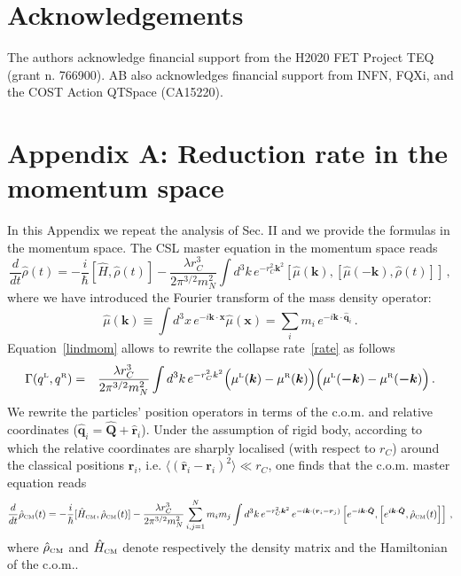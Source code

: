 \documentclass[11pt,onecolumn,amssymb,nofootinbib]{revtex4}
\newcommand\beq{\begin{equation}}
\newcommand\eeq{\end{equation}}
\newcommand\beqa{\begin{eqnarray}}
\newcommand\eeqa{\end{eqnarray}}
\newcommand\ro{\hat\rho}
\newcommand\Ho{\hat H}
\newcommand\bk{\boldsymbol{k}}
\newcommand\br{\boldsymbol{r}}
\newcommand\bqo{\hat{\boldsymbol{q}}}
\newcommand\bro{\hat{\boldsymbol{r}}}
\newcommand\bQo{\hat{\boldsymbol{Q}}}
\begin{document}
\section*{Acknowledgements}
The authors acknowledge financial support from the H2020 FET Project TEQ (grant n. 766900). AB also acknowledges financial support from INFN, FQXi, and the COST Action QTSpace (CA15220).

\section*{Appendix A: Reduction rate in the momentum space}

In this Appendix we repeat the analysis of Sec. II and we provide the formulas in the momentum space.
The CSL master equation in the momentum space reads
\beq\label{lindmom}
\frac{d}{dt}\hat{\rho}(t)=-\frac{i}{\hbar}[\Ho,\ro(t)]-\frac{\lambda r_C^3}{2\pi^{3/2}m_N^2}\int d^3k\, e^{-r_C^2\boldsymbol{k}^2}[\hat{\mu}(\boldsymbol{k}),[\hat{\mu}(-\boldsymbol{k}),\ro(t)]]\,,
\eeq
where we have introduced the Fourier transform of the mass density operator:
\begin{equation}\label{mumom}
\hat{\mu}(\boldsymbol{k})\equiv\int d^3x\,e^{-i\boldsymbol{k}\cdot\boldsymbol{x}}\hat{\mu}(\boldsymbol{x})=\sum_im_i\,e^{-i\boldsymbol{k}\cdot\hat{\boldsymbol{q}}_i}\,.
\end{equation}
Equation~\eqref{lindmom} allows to rewrite the collapse rate~\eqref{rate} as follows
\beqa\label{ratemom}
\Gamma(q^{\text{\tiny{L}}},q^{\text{\tiny{R}}})&=&\frac{\lambda r^3_C}{2\pi^{3/2}m_N^2}\int d^3k\, e^{-r_C^2k^2} \Big(\mu^{\text{\tiny{L}}}(\boldsymbol{k})-\mu^{\text{\tiny{R}}}(\boldsymbol{k})\Big)\Big(\mu^{\text{\tiny{L}}}(\boldsymbol{-k})-\mu^{\text{\tiny{R}}}(\boldsymbol{-k})\Big)\,.
\eeqa
We rewrite the particles' position operators in terms of the c.o.m. and relative coordinates ($\bqo_i=\bQo+\bro_i$). Under the assumption of rigid body, according to which the relative coordinates are sharply localised (with respect to $r_C$) around the classical positions $\br_i$, i.e. $\langle(\bro_i-\br_i)^2\rangle\ll r_C$, one finds that the c.o.m. master equation reads
\beq\label{lindmomrel}
\frac{d}{dt}\hat{\rho}_{\text{\tiny{CM}}}(t)=-\frac{i}{\hbar}[\Ho_{\text{\tiny{CM}}},\ro_{\text{\tiny{CM}}}(t)]-\frac{\lambda r_C^3}{2\pi^{3/2}m_N^2}\sum_{i,j=1}^Nm_im_j\int d^3k\, e^{-r_C^2\boldsymbol{k}^2}\,e^{-i\bk\cdot(\br_i-\br_j)}\left[e^{-i\bk\cdot\bQo},\left[e^{i\bk\cdot\bQo},\ro_{\text{\tiny{CM}}}(t)\right]\right]\,,
\eeq
where $\hat{\rho}_{\text{\tiny{CM}}}$ and $\Ho_{\text{\tiny{CM}}}$ denote respectively the density matrix and the Hamiltonian of the c.o.m..
\end{document}
